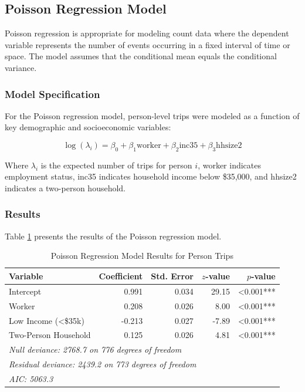 \documentclass[12pt]{article}
\begin{document}
\subsection{Poisson Regression Model}

Poisson regression is appropriate for modeling count data where the dependent variable represents the number of events occurring in a fixed interval of time or space. The model assumes that the conditional mean equals the conditional variance.

\subsubsection{Model Specification}

For the Poisson regression model, person-level trips were modeled as a function of key demographic and socioeconomic variables:

$$\log(\lambda_i) = \beta_0 + \beta_1 \text{worker} + \beta_2 \text{inc35} + \beta_3 \text{hhsize2}$$

Where $\lambda_i$ is the expected number of trips for person $i$, worker indicates employment status, inc35 indicates household income below \$35,000, and hhsize2 indicates a two-person household.

\subsubsection{Results}

Table \ref{tab:poisson_results} presents the results of the Poisson regression model.

\begin{table}[h]
\centering
\caption{Poisson Regression Model Results for Person Trips}
\label{tab:poisson_results}
\begin{tabular}{lrrrr}
\toprule
Variable & Coefficient & Std. Error & $z$-value & $p$-value \\
\midrule
Intercept & 0.991 & 0.034 & 29.15 & <0.001*** \\
Worker & 0.208 & 0.026 & 8.00 & <0.001*** \\
Low Income (<\$35k) & -0.213 & 0.027 & -7.89 & <0.001*** \\
Two-Person Household & 0.125 & 0.026 & 4.81 & <0.001*** \\
\bottomrule
\multicolumn{5}{l}{\textit{Null deviance: 2768.7 on 776 degrees of freedom}} \\
\multicolumn{5}{l}{\textit{Residual deviance: 2439.2 on 773 degrees of freedom}} \\
\multicolumn{5}{l}{\textit{AIC: 5063.3}}
\end{tabular}
\end{table}
\end{document}
